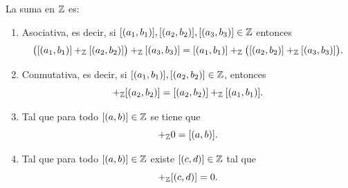 \documentclass[12pt,a4paper]{book}
\begin{document}
    \begin{proposicion}
        \label{prop:suma-Z-grupo}
        La suma en $\mathbb{Z}$ es:
        \begin{enumerate}
            \item[(1)] Asociativa, es decir, si $[(a_{1},b_{1})],[(a_{2},b_{2})],[(a_{3},b_{3})]\in\mathbb{Z}$ entonces
            \begin{equation*}
                \big([(a_{1},b_{1})]+_{\mathbb{Z}}[(a_{2},b_{2})]\big)+_{\mathbb{Z}}[(a_{3},b_{3})] = [(a_{1},b_{1})]+_{\mathbb{Z}}\big([(a_{2},b_{2})]+_{\mathbb{Z}}[(a_{3},b_{3})]\big).
            \end{equation*}
            \item[(2)] Conmutativa, es decir, si $[(a_{1},b_{1})],[(a_{2},b_{2})]\in\mathbb{Z}$, entonces
            \begin{equation*}
                [(a_{1},b_{1})]+_{\Z}[(a_{2},b_{2})]=[(a_{2},b_{2})]+_{\Z}[(a_{1},b_{1})].
            \end{equation*}
            \item[(3)] Tal que para todo $[(a,b)]\in\mathbb{Z}$ se tiene que
            \begin{equation*}
                [(a,b)]+_{\Z}0=[(a,b)].
            \end{equation*}
            \item[(4)] Tal que para todo $[(a,b)]\in\mathbb{Z}$ existe $[(c,d)]\in\mathbb{Z}$ tal que
            \begin{equation*}
                [(a,b)]+_{\Z}[(c,d)]=0.
            \end{equation*}
        \end{enumerate}
    \end{proposicion}
\end{document}
